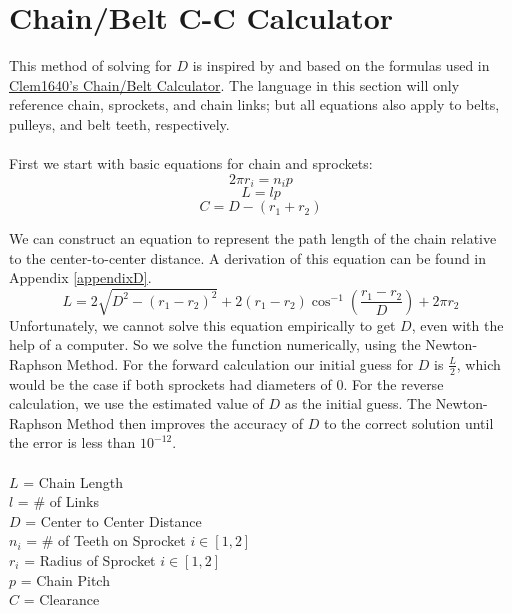 \documentclass[11pt,a4paper,titlepage]{article}
\begin{document}
	\bigskip
	\section{Chain/Belt C-C Calculator}
	This method of solving for $D$ is inspired by and based on the formulas used in \href{https://www.chiefdelphi.com/t/paper-chain-belt-calculator/168971}{Clem1640's Chain/Belt Calculator}. The language in this section will only reference chain, sprockets, and chain links; but all equations also apply to belts, pulleys, and belt teeth, respectively. \\ \\		
	First we start with basic equations for chain and sprockets:
	\begin{equation}
		2 \pi r_i = n_i p
	\end{equation}
	\begin{equation}
		L = l p
	\end{equation}
	\begin{equation}
		C = D - (r_1 + r_2)
	\end{equation}
	
	We can construct an equation to represent the path length of the chain relative to the center-to-center distance. A derivation of this equation can be found in Appendix \ref{appendixD}.
	\begin{equation} \label{chain_len}
		L = 2 \sqrt{D^2 - (r_1 - r_2)^2} + 2 (r_1 - r_2) \cos^{-1} \left( \frac{r_1 - r_2}{D} \right) + 2 \pi r_2
	\end{equation}
	Unfortunately, we cannot solve this equation empirically to get $D$, even with the help of a computer. So we solve the function numerically, using the Newton-Raphson Method. For the forward calculation our initial guess for $D$ is $\frac{L}{2}$, which would be the case if both sprockets had diameters of 0. For the reverse calculation, we use the estimated value of $D$ as the initial guess. The Newton-Raphson Method then improves the accuracy of $D$ to the correct solution until the error is less than $10^{-12}$.\\ \\
	$L$ = Chain Length \\
	$l$ = \# of Links \\
	$D$ = Center to Center Distance \\
	$n_i$ = \# of Teeth on Sprocket $i \in [1,2]$ \\
	$r_i$ = Radius of Sprocket $i \in [1,2]$ \\
	$p$ = Chain Pitch \\
	$C$ = Clearance \\ \\
	
\end{document}
